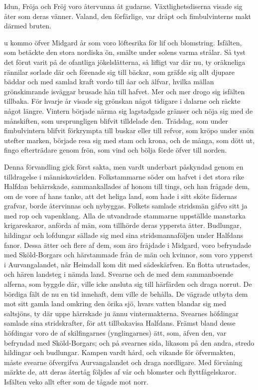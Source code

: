 Idun, Fröja och Fröj voro återvunna åt gudarne. Växtlighetsdiserna
visade sig åter som deras vänner. Valand, den förfärlige, var dräpt och
fimbulvinterns makt därmed bruten.

\endSecII


\dropcapN u kommo öfver Midgard år som voro löftesrika för lif och blomstring.
Isfälten, som betäckte den stora nordiska ön, smälte under solens varma
strålar. Så tyst det förut varit på de ofantliga jökelslätterna, så
lifligt var där nu, ty oräkneliga rännilar sorlade där och förenade sig
till bäckar, som gräfde sig allt djupare bäddar och med samlad kraft
vordo till åar och älfvar, hvilka mällan grönskimrande isväggar brusade
hän till hafvet. Mer och mer drogo sig isfälten tillbaka. För hvarje år
visade sig grönskan något tidigare i dalarne och räckte något längre.
Vintern började närma sig
lagstadgade gränser och nöja sig med de månskiften, som ursprungligen
blifvit tilldelade den. Trädslag, som under fimbulvintern blifvit
förkrympta till buskar eller till refvor, som kröpo under snön utefter
marken, började resa sig med stam och krona, och de många, som dött ut,
fingo efterträdare genom frön, som vind och bölja förde öfver till
norden.

Denna förvandling gick först sakta, men vardt underbart påskyndad genom
en tilldragelse i människovärlden. Folkstammarne söder om hafvet i det
stora rike Halfdan behärrskade, sammankallades af honom till tings, och
han frågade dem, om de vore af hans tanke, att det heliga land, som hade
i sitt sköte fädernas grafvar, borde återvinnas och nybyggas. Folkets
samlade stridsmän gåfvo sitt ja med rop och vapenklang. Alla de
utvandrade stammarne uppställde manstarka krigareskaror, anförda af män,
som tillhörde deras yppersta ätter. Budlungar, hildingar och lofdungar
sällade sig med sina stridsmannaföljen under Halfdans fanor. Dessa ätter
och flere af dem, som äro fräjdade i Midgard, voro befryndade med
Sköld-Borgars och härstammade från de män och kvinnor, som voro ypperst
i Aurvangalandet, när Heimdall kom dit med sädeskärfven. En flotta
utrustades, och hären landsteg i nämda land. Svearne och de med dem
sammanboende alferna, som byggde där, ville icke ansluta sig till
härfärden och draga norrut. De bördiga fält de nu en tid innehaft, dem
ville de behålla. De vägrade utbyta dem mot sitt gamla land omkring den
örika sjö, hvars vatten blandar sig med saltsjöns, ty där uppe härrskade
ju ännu vintermakterna. Svearnes höfdingar samlade sina stridskrafter,
för att tillbakavisa Halfdans. Främst bland desse höfdingar voro de af
skilfingarnes (ynglingarnes) ätt, som, äfven den, var befryndad med
Sköld-Borgars; och på svearnes sida, likasom på den andra, stredo
hildingar och budlungar. Kampen vardt hård, och vikande för öfvermakten,
måste svearne öfvergifva Aurvangalandet och draga nordligare. Med
förvåning märkte de, att deras återtåg följdes af vår och blomster och
flyttfågelskaror. Isfälten veko allt efter som de tågade mot norr.

